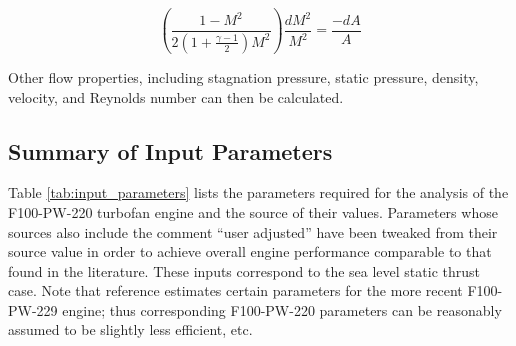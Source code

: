 \documentclass{article}
\begin{document}
\begin{equation}
\label{eq:mach_squared}
\left(\frac{1-M^2}{2(1 + \frac{\gamma-1}{2} )M^2}\right) \frac{dM^2}{M^2} = \frac{-dA}{A}
\end{equation}

Other flow properties, including stagnation pressure, static pressure, density, velocity, and Reynolds number can then be calculated. 

\subsection{Summary of Input Parameters}

Table \ref{tab:input_parameters} lists the parameters required for the analysis of the F100-PW-220 turbofan engine and the source of their values. Parameters whose sources also include the comment ``user adjusted'' have been tweaked from their source value in order to achieve overall engine performance comparable to that found in the literature. These inputs correspond to the sea level static thrust case. Note that reference \cite{Lee2009} estimates certain parameters for the more recent F100-PW-229 engine; thus corresponding F100-PW-220 parameters can be reasonably assumed to be slightly less efficient, etc.
\end{document}
